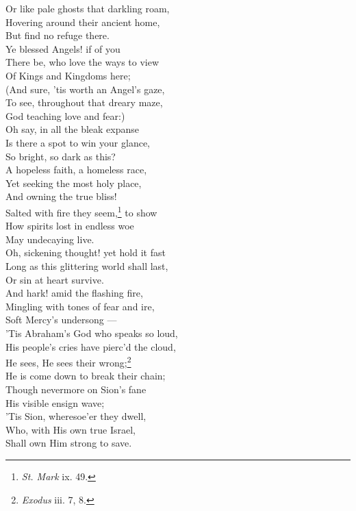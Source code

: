  Or like pale ghosts that darkling roam, \\
 Hovering around their ancient home, \\
 But find no refuge there. \\
  Ye blessed Angels! if of you \\
 There be, who love the ways to view \\
 Of Kings and Kingdoms here; \\
 (And sure, ’tis worth an Angel’s gaze, \\
 To see, throughout that dreary maze, \\
 God teaching love and fear:) \\
  Oh say, in all the bleak expanse \\
 Is there a spot to win your glance, \\
 So bright, so dark as this? \\
 A hopeless faith, a homeless race, \\
 Yet seeking the most holy place, \\
 And owning the true bliss! \\
  Salted with fire they seem,\footnote{\emph{St. Mark} ix. 49.} to show \\
 How spirits lost in endless woe \\
 May undecaying live. \\
 Oh, sickening thought! yet hold it fast \\
 Long as this glittering world shall last, \\
 Or sin at heart survive. \\
  And hark! amid the flashing fire, \\
 Mingling with tones of fear and ire, \\
 Soft Mercy’s undersong — \\
 ’Tis Abraham’s God who speaks so loud, \\
 His people’s cries have pierc’d the cloud, \\
 He sees, He sees their wrong;\footnote{\emph{Exodus} iii. 7, 8.} \\
  He is come down to break their chain; \\
 Though nevermore on Sion’s fane \\
 His visible ensign wave; \\
 ’Tis Sion, wheresoe’er they dwell, \\
 Who, with His own true Israel, \\
 Shall own Him strong to save. \\
